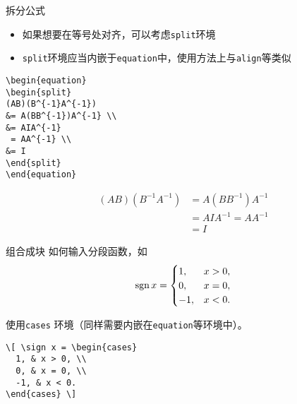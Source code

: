 \begin{frame}[fragile]{拆分公式}
	\begin{itemize}
		\item 如果想要在等号处对齐，可以考虑\texttt{split}环境
		\item \texttt{split}环境应当内嵌于\texttt{equation}中，使用方法上与\texttt{align}等类似
	\end{itemize}
	\clean
	\begin{minipage}{0.43\textwidth}
\begin{lstlisting}
\begin{equation}
\begin{split}
(AB)(B^{-1}A^{-1}) 
&= A(BB^{-1})A^{-1} \\
&= AIA^{-1} 
 = AA^{-1} \\
&= I
\end{split}
\end{equation}
\end{lstlisting}
	\end{minipage}
	\begin{minipage}{0.56\textwidth}
		\begin{equation} \begin{split}
			(AB) (B^{-1}A^{-1}) &= A(BB^{-1})A^{-1} \\
			&= AIA^{-1} = AA^{-1} \\
			&= I
		\end{split} \end{equation}
	\end{minipage}
\end{frame}
\begin{frame}[fragile]{组合成块}
	如何输入分段函数，如
	\[ \operatorname{sgn} x = \begin{cases}
	1, & x > 0, \\
	0, & x = 0, \\
	-1, & x < 0.
	\end{cases} \]

	使用\texttt{cases} 环境（同样需要内嵌在\texttt{equation}等环境中）。
\begin{lstlisting}
\[ \sign x = \begin{cases}
  1, & x > 0, \\
  0, & x = 0, \\
  -1, & x < 0.
\end{cases} \]
\end{lstlisting}
\end{frame}

